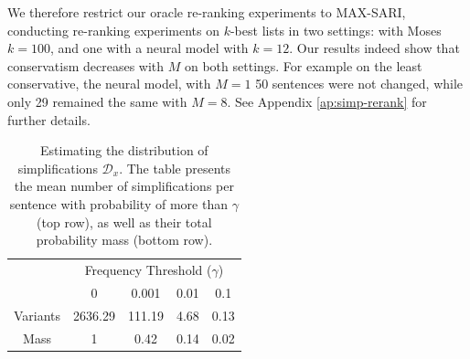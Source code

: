 \documentclass[letterpaper, 11pt]{article}
\begin{document}
We therefore restrict our oracle re-ranking experiments to MAX-SARI, conducting re-ranking experiments on $k$-best
lists in two settings: with Moses \cite{koehn2007koehn} 
$k=100$, and one with a neural model \cite{nisioi2017exploring} with $k=12$. 
Our results indeed show that conservatism decreases with $M$ on both settings. 
For example on the least conservative, the neural model, with $M=1$ 50 sentences were not changed, while only 29 remained the same 
with $M=8$. See Appendix \ref{ap:simp-rerank} for further details.




\begin{table}[t]
	\vspace{-0.5cm}
	\centering
	\small
	\singlespacing
	\begin{tabular}{c|c|c|c|c|}
		& \multicolumn{4}{c|}{Frequency Threshold ($\gamma$)}\\ 
		& \multicolumn{1}{c}{0} & \multicolumn{1}{c}{0.001} & \multicolumn{1}{c}{0.01} & \multicolumn{1}{c|}{0.1}
		\\
		\hline
		Variants & 2636.29 & 111.19 & 4.68 & 0.13
		\\
		Mass & 1 & 0.42 & 0.14 & 0.02\\
		\hline
	\end{tabular}
	\caption{\label{tab:simplifications_dist}
		Estimating the distribution of simplifications $\mathcal{D}_x$.
		The table presents the mean number of simplifications per sentence with probability of more than
		$\gamma$ (top row), as well as their total probability mass (bottom row).
	}
	\vspace{-0.3cm}
\end{table}
\end{document}
